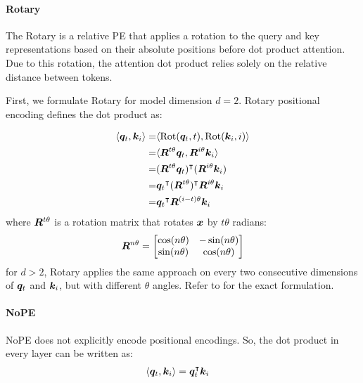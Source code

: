 \documentclass{article}
\begin{document}
\paragraph{Rotary}
The Rotary is a relative PE that applies a rotation to the query and key representations based on their absolute positions before dot product attention. Due to this rotation, the attention dot product relies solely on the relative distance between tokens.

First, we formulate Rotary for model dimension $d=2$.
Rotary positional encoding defines the dot product as:

\begin{align}
  \label{eq:rotary}
  \langle {\bm{q}}_t, {\bm{k}}_i \rangle = &
  \langle \mathrm{Rot}({\bm{q}}_t, t), \mathrm{Rot}({\bm{k}}_i, i) \rangle                                             \nonumber \\
  =                              & \langle {\bm{R}}^{t\theta}{\bm{q}}_t, {\bm{R}}^{i\theta}{\bm{k}}_i \rangle          \nonumber               \\
  =                              & ({\bm{R}}^{t\theta}{\bm{q}}_t)^\intercal ({\bm{R}}^{i\theta}{\bm{k}}_i)             \nonumber           \\
  =                              & {{\bm{q}}_t}^\intercal ({\bm{R}}^{t\theta}) ^\intercal {\bm{R}}^{i\theta}{\bm{k}}_i \nonumber           \\
  =                              & {{\bm{q}}_t}^\intercal {\bm{R}}^{(i-t)\theta} {\bm{k}}_i                     \nonumber             \\
\end{align}
where ${\bm{R}}^{t\theta}$ is a rotation matrix that rotates ${\bm{x}}$ by $t\theta$ radians:
\begin{align}
  \label{eq:rotary_matrix}
  {\bm{R}}^{n\theta} = \begin{bmatrix}
                    \cos(n\theta) & -\sin(n\theta) \\
                    \sin(n\theta) & \cos(n\theta)
                  \end{bmatrix}
\end{align}
for $d>2$, Rotary applies the same approach on every two consecutive dimensions of ${\bm{q}}_t$ and ${\bm{k}}_i$, but with different $\theta$ angles. Refer to \citet{Su2021:Rotary} for the exact formulation.

\paragraph{NoPE}
NoPE does not explicitly encode positional encodings. So, the dot product in every layer can be written as:
\begin{align}
  \label{eq:nope}
  \langle {\bm{q}}_t, {\bm{k}}_i \rangle & = {\bm{q}}_t^\intercal {\bm{k}}_i
\end{align}
\end{document}
